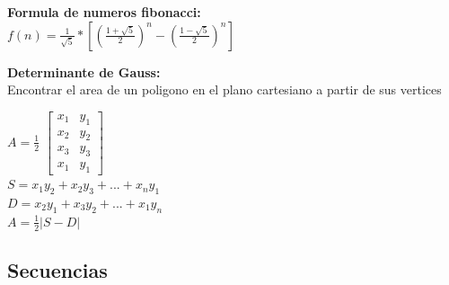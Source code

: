 \documentclass[10pt,landscape,twocolumn,a4paper,notitlepage]{article}
\begin{document}
			\vspace{8mm}
			\textbf{Formula de numeros fibonacci:}\\
			\vspace{3mm}
			{\Large $f(n) = \frac{1}{\sqrt{5}} * [ (\frac{1 + \sqrt{5}}{2})^{n}  - (\frac{1 - \sqrt{5}}{2})^{n}]$ }
			
			\vspace{8mm}
			\textbf{Determinante de Gauss:}\\ 
			Encontrar el area de un poligono en el plano cartesiano a partir de sus vertices\\
			\vspace{3mm}
			\newpage			
			
			{\large$A = \frac{1}{2} $}
			{\large $ \begin{bmatrix}
				x_{1} & y_{1} \\ 
				x_{2} & y_{2} \\ 
				x_{3} & y_{3} \\ 
				x_{1} & y_{1} 
			\end{bmatrix}$ } \\ 
			\vspace{3mm}
			{\large $S = x_{1}y_{2} + x_{2}y_{3} +...+ x_{n}y_{1}$} \\ 
			\vspace{3mm}
			{\large $D = x_{2}y_{1} + x_{3}y_{2} +...+ x_{1}y_{n}$} \\ 
			\vspace{3mm}
			{\large $A = \frac{1}{2} |S - D|$}
			\vspace{3mm}
			
		\subsection{Secuencias}
		
\end{document}
